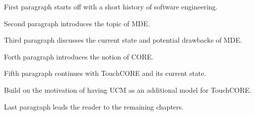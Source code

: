 First paragraph starts off with a short history of software engineering.

Second paragraph introduces the topic of MDE.

Third paragraph discusses the current state and potential drawbacks of MDE.

Forth paragraph introduces the notion of CORE.

Fifth paragraph continues with TouchCORE and its current state.

Build on the motivation of having UCM as an additional model for TouchCORE.

Last paragraph leads the reader to the remaining chapters.
